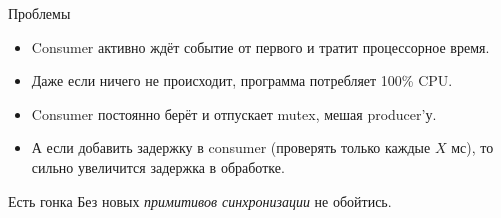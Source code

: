 \begin{frame}{Проблемы}
	\begin{itemize}
		\item Consumer активно ждёт событие от первого и тратит процессорное время.
		\item Даже если ничего не происходит, программа потребляет 100\% CPU.
		\item Consumer постоянно берёт и отпускает mutex, мешая producer'у.
		\item
			А если добавить задержку в consumer (проверять только каждые $X$ мс),
			то сильно увеличится задержка в обработке.
	\end{itemize}
\end{frame}

\begin{frame}{Есть гонка}
	Без новых \textit{примитивов синхронизации} не обойтись.
\end{frame}
